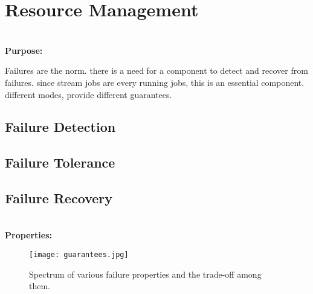 \section{Resource Management}
\label{sec:resource}

\noindent \textbf{\\Purpose:} 

Failures are the norm. there is a need for a component to detect and recover from failures. since stream jobs are every running jobs, this is an essential component. different modes, provide different guarantees.

\subsection{Failure Detection}
\subsection{Failure Tolerance}
\subsection{Failure Recovery}

\noindent \textbf{\\Properties:}


\begin{figure}[h]
	\centering
	\texttt{[image: guarantees.jpg]}
	\caption{Spectrum of various failure properties and the trade-off among them.}
	\label{fig:failure}
\end{figure}

